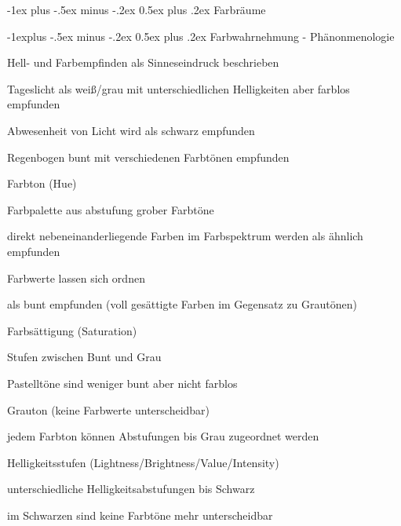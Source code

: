 \documentclass[landscape]{article}
\makeatletter
\renewcommand{\section}{\@startsection{section}{1}{0mm}%
                                {-1ex plus -.5ex minus -.2ex}%
                                {0.5ex plus .2ex}%
                                {\normalfont\large\bfseries}}
\renewcommand{\subsection}{\@startsection{subsection}{2}{0mm}%
                                {-1explus -.5ex minus -.2ex}%
                                {0.5ex plus .2ex}%
                                {\normalfont\normalsize\bfseries}}
\makeatother
\begin{document}
\begin{multicols}{3}
  \section{Farbräume}
  
  \subsection{Farbwahrnehmung - Phänonmenologie}
  \begin{itemize*}
    \item Hell- und Farbempfinden als Sinneseindruck beschrieben
    \item Tageslicht als weiß/grau mit unterschiedlichen Helligkeiten aber farblos empfunden
    \item Abwesenheit von Licht wird als schwarz empfunden
    \item Regenbogen bunt mit verschiedenen Farbtönen empfunden
  \end{itemize*}
  \begin{description*}
    \item[Farbton] (Hue)
    \begin{itemize*}
      \item Farbpalette aus abstufung grober Farbtöne 
      \item direkt nebeneinanderliegende Farben im Farbspektrum werden als ähnlich empfunden
      \item Farbwerte lassen sich ordnen
      \item als bunt empfunden (voll gesättigte Farben im Gegensatz zu Grautönen)
    \end{itemize*}
    \item[Farbsättigung] (Saturation)
    \begin{itemize*}
      \item Stufen zwischen Bunt und Grau
      \item Pastelltöne sind weniger bunt aber nicht farblos
      \item Grauton (keine Farbwerte unterscheidbar)
      \item jedem Farbton können Abstufungen bis Grau zugeordnet werden
    \end{itemize*}
    \item[Helligkeitsstufen] (Lightness/Brightness/Value/Intensity)
    \begin{itemize*}
      \item unterschiedliche Helligkeitsabstufungen bis Schwarz
      \item im Schwarzen sind keine Farbtöne mehr unterscheidbar
    \end{itemize*}
  \end{description*}
  

\end{multicols}
\end{document}
